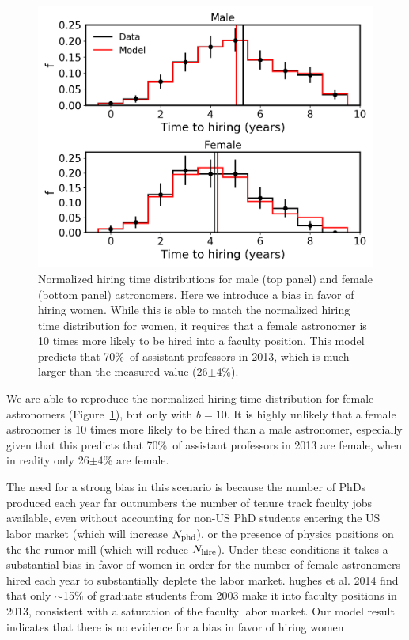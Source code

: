 \documentclass[modern]{aastex62}
\begin{document}
\begin{figure}[!hbt]
\center
\includegraphics[scale=.6]{model2_b10.png}
\caption{Normalized hiring time distributions for male (top panel) and female (bottom panel) astronomers. Here we introduce a bias in favor of hiring women. While this is able to match the normalized hiring time distribution for women, it requires that a female astronomer is 10 times more likely to be hired into a faculty position. This model predicts that 70\%\ of assistant professors in 2013, which is much larger than the measured value (26$\pm$4\%). \label{model2_b10}}
\end{figure}

We are able to reproduce the normalized hiring time distribution for female astronomers (Figure~\ref{model2_b10}), but only with $b=10$. It is highly unlikely that a female astronomer is 10 times more likely to be hired than a male astronomer, especially given that this predicts that 70\%\ of assistant professors in 2013 are female, when in reality only 26$\pm$4\% are female. 

The need for a strong bias in this scenario is because the number of PhDs produced each year far outnumbers the number of tenure track faculty jobs available, even without accounting for non-US PhD students entering the US labor market (which will increase $N_{\rm phd}$), or the presence of physics positions on the the rumor mill (which will reduce $N_{\rm hire}$). Under these conditions it takes a substantial bias in favor of women in order for the number of female astronomers hired each year to substantially deplete the labor market. hughes et al. 2014 find that only $\sim$15\% of graduate students from 2003 make it into faculty positions in 2013, consistent with a saturation of the faculty labor market. Our model result indicates that there is no evidence for a bias in favor of hiring women 
\end{document}
